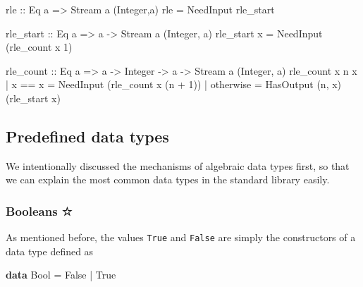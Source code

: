 \documentclass[11pt,
  american,
  DIV13]{article}
\newenvironment{Shaded}{}{}
\newcommand{\DataTypeTok}[1]{\textcolor[rgb]{0.56,0.13,0.00}{#1}}
\newcommand{\DecValTok}[1]{\textcolor[rgb]{0.25,0.63,0.44}{#1}}
\newcommand{\FunctionTok}[1]{\textcolor[rgb]{0.02,0.16,0.49}{#1}}
\newcommand{\KeywordTok}[1]{\textcolor[rgb]{0.00,0.44,0.13}{\textbf{#1}}}
\newcommand{\NormalTok}[1]{#1}
\newcommand{\OperatorTok}[1]{\textcolor[rgb]{0.40,0.40,0.40}{#1}}
\newcommand{\OtherTok}[1]{\textcolor[rgb]{0.00,0.44,0.13}{#1}}
\begin{document}
\begin{Shaded}
\begin{Highlighting}[]
\OtherTok{rle ::} \DataTypeTok{Eq}\NormalTok{ a }\OtherTok{=\textgreater{}} \DataTypeTok{Stream}\NormalTok{ a (}\DataTypeTok{Integer}\NormalTok{,a)}
\NormalTok{rle }\OtherTok{=} \DataTypeTok{NeedInput}\NormalTok{ rle\_start}

\OtherTok{rle\_start ::} \DataTypeTok{Eq}\NormalTok{ a }\OtherTok{=\textgreater{}}\NormalTok{ a }\OtherTok{{-}\textgreater{}} \DataTypeTok{Stream}\NormalTok{ a (}\DataTypeTok{Integer}\NormalTok{, a)}
\NormalTok{rle\_start x }\OtherTok{=} \DataTypeTok{NeedInput}\NormalTok{ (rle\_count x }\DecValTok{1}\NormalTok{)}

\OtherTok{rle\_count ::} \DataTypeTok{Eq}\NormalTok{ a }\OtherTok{=\textgreater{}}\NormalTok{ a }\OtherTok{{-}\textgreater{}} \DataTypeTok{Integer} \OtherTok{{-}\textgreater{}}\NormalTok{ a }\OtherTok{{-}\textgreater{}} \DataTypeTok{Stream}\NormalTok{ a (}\DataTypeTok{Integer}\NormalTok{, a)}
\NormalTok{rle\_count x n x\textquotesingle{} }\OperatorTok{|}\NormalTok{ x }\OperatorTok{==}\NormalTok{ x\textquotesingle{} }\OtherTok{=} \DataTypeTok{NeedInput}\NormalTok{ (rle\_count x (n }\OperatorTok{+} \DecValTok{1}\NormalTok{))}
                 \OperatorTok{|} \FunctionTok{otherwise} \OtherTok{=} \DataTypeTok{HasOutput}\NormalTok{ (n, x) (rle\_start x\textquotesingle{})}
\end{Highlighting}
\end{Shaded}

\hypertarget{predefined-data-types}{%
\subsection{Predefined data types}\label{predefined-data-types}}

We intentionally discussed the mechanisms of algebraic data types first,
so that we can explain the most common data types in the standard
library easily.

\hypertarget{booleans}{%
\subsubsection{Booleans ☆}\label{booleans}}

As mentioned before, the values \texttt{True} and \texttt{False} are
simply the constructors of a data type defined as

\begin{Shaded}
\begin{Highlighting}[]
\KeywordTok{data} \DataTypeTok{Bool} \OtherTok{=} \DataTypeTok{False} \OperatorTok{|} \DataTypeTok{True}
\end{Highlighting}
\end{Shaded}
\end{document}
